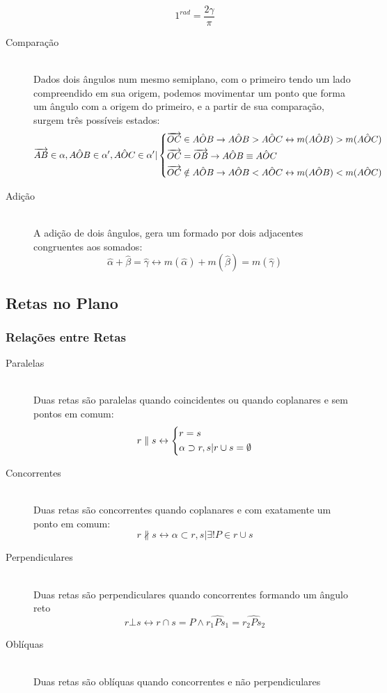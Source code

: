 \begin{description}
                \[ 1^{rad} = \frac{2\gamma}{\pi} \]
            \item[Comparação] \hfill \\
                Dados dois ângulos num mesmo semiplano, com o primeiro tendo um lado compreendido em sua origem, podemos movimentar um ponto que forma um ângulo com a origem do primeiro, e a partir de sua comparação, surgem três possíveis estados:
                \[ \overrightarrow{AB} \in \alpha , \hat{AOB} \in \alpha' , \hat{AOC} \in \alpha' | \begin{dcases} \overrightarrow{OC} \in \hat{AOB} \rightarrow \hat{AOB} > \hat{AOC} \leftrightarrow m(\hat{AOB}) > m(\hat{AOC}) \\ \overrightarrow{OC} = \overrightarrow{OB} \rightarrow \hat{AOB} \equiv \hat{AOC} \\ \overrightarrow{OC} \notin \hat{AOB} \rightarrow \hat{AOB} < \hat{AOC} \leftrightarrow m(\hat{AOB}) < m(\hat{AOC})  \end{dcases} \]
            \item[Adição] \hfill \\
                A adição de dois ângulos, gera um formado por dois adjacentes congruentes aos somados:
                \[ \hat{\alpha} + \hat{\beta} = \hat{\gamma} \leftrightarrow m(\hat{\alpha}) + m(\hat{\beta}) = m(\hat{\gamma}) \]
        \end{description}
\subsection{Retas no Plano}
    \subsubsection{Relações entre Retas}
        \begin{description}
            \item[Paralelas] \hfill \\
                Duas retas são paralelas quando coincidentes ou quando coplanares e sem pontos em comum:
                \[ r \parallel s \leftrightarrow \begin{dcases} r = s \\ \alpha \supset r,s | r \cup s = \emptyset \end{dcases} \]
            \item[Concorrentes] \hfill \\
                Duas retas são concorrentes quando coplanares e com exatamente um ponto em comum:
                \[ r \nparallel s \leftrightarrow \alpha \subset r, s | \exists!P \in r \cup s \]
            \item[Perpendiculares] \hfill \\
                Duas retas são perpendiculares quando concorrentes formando um ângulo reto
                \[ r \bot s \leftrightarrow r \cap s = P \wedge \hat{r_1Ps_1} = \hat{r_2Ps_2} \]
            \item[Oblíquas] \hfill \\
                Duas retas são oblíquas quando concorrentes e não perpendiculares
        \end{description}
